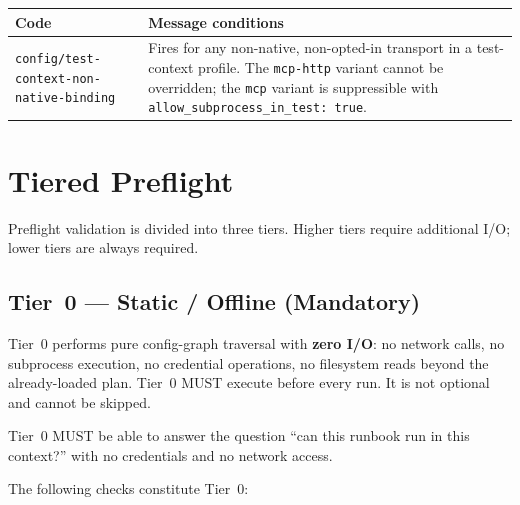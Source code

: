\begin{center}
\begin{tabular}{lp{9cm}}
\toprule
\textbf{Code} & \textbf{Message conditions} \\
\midrule
\texttt{config/test-context-non-native-binding}
  & Fires for any non-native, non-opted-in transport in a test-context
    profile.  The \texttt{mcp-http} variant cannot be overridden; the
    \texttt{mcp} variant is suppressible with
    \texttt{allow\_subprocess\_in\_test: true}. \\
\bottomrule
\end{tabular}
\end{center}

\section{Tiered Preflight}
\label{sec:rp-preflight}

Preflight validation is divided into three tiers.  Higher tiers require
additional I/O; lower tiers are always required.

\subsection{Tier~0 — Static / Offline (Mandatory)}
\label{subsec:rp-preflight-t0}

Tier~0 performs pure config-graph traversal with \textbf{zero I/O}: no
network calls, no subprocess execution, no credential operations, no
filesystem reads beyond the already-loaded plan.  Tier~0 MUST execute before
every run.  It is not optional and cannot be skipped.

Tier~0 MUST be able to answer the question ``can this runbook run in this
context?'' with no credentials and no network access.

The following checks constitute Tier~0:

